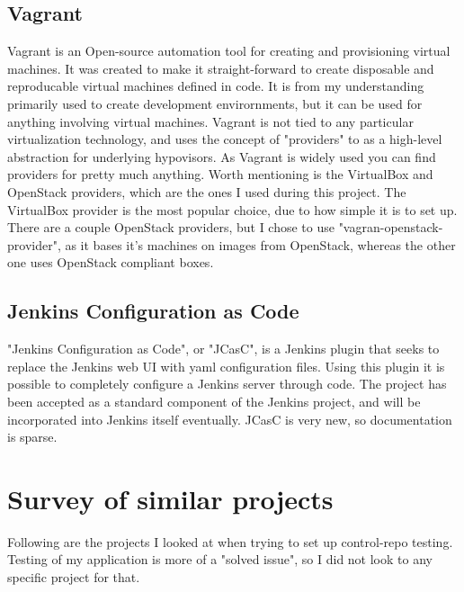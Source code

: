 \subsection{Vagrant}

Vagrant\cite{vagrantwebsite} is an Open-source automation tool for creating and provisioning virtual machines. It was created to make it straight-forward to create disposable and reproducable virtual machines defined in code. It is from my understanding primarily used to create development envirornments, but it can be used for anything involving virtual machines. Vagrant is not tied to any particular virtualization technology, and uses the concept of "providers" to as a high-level abstraction for underlying hypovisors. As Vagrant is widely used you can find providers for pretty much anything. Worth mentioning is the VirtualBox and OpenStack providers, which are the ones I used during this project. The VirtualBox provider is the most popular choice, due to how simple it is to set up. There are a couple OpenStack providers, but I chose to use "vagran-openstack-provider"\cite{vagrantopenstackprovidergithub}, as it bases it's machines on images from OpenStack, whereas the other one uses OpenStack compliant boxes.

\subsection{Jenkins Configuration as Code}

"Jenkins Configuration as Code"\cite{jcascwebsite}, or "JCasC", is a Jenkins plugin that seeks to replace the Jenkins web UI with yaml configuration files. Using this plugin it is possible to completely configure a Jenkins server through code. The project has been accepted as a standard component of the Jenkins project, and will be incorporated into Jenkins itself eventually. JCasC is very new, so documentation is sparse.


\section{Survey of similar projects}

Following are the projects I looked at when trying to set up control-repo testing. Testing of my application is more of a "solved issue", so I did not look to any specific project for that.

